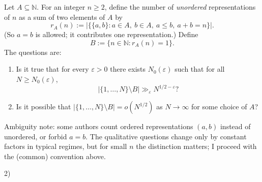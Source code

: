 Let $A\subseteq\mathbb{N}$. For an integer $n\ge 2$, define the number of \emph{unordered} representations of $n$ as a sum of two elements of $A$ by
\[
 r_A(n):=|\{\{a,b\}: a\in A,\ b\in A,\ a\le b,\ a+b=n\}|.
\]
(So $a=b$ is allowed; it contributes one representation.)
Define
\[
 B:=\{n\in\mathbb{N}: r_A(n)=1\}.
\]
The questions are:
\begin{enumerate}
\item[(Q1)] Is it true that for every $\varepsilon>0$ there exists $N_0(\varepsilon)$ such that for all $N\ge N_0(\varepsilon)$,
\[
|\{1,\dots,N\}\setminus B| \gg_{\varepsilon} N^{1/2-\varepsilon}?
\]
\item[(Q2)] Is it possible that $|\{1,\dots,N\}\setminus B|=o(N^{1/2})$ as $N\to\infty$ for some choice of $A$?
\end{enumerate}

Ambiguity note: some authors count ordered representations $(a,b)$ instead of unordered, or forbid $a=b$. The qualitative questions change only by constant factors in typical regimes, but for small $n$ the distinction matters; I proceed with the (common) convention above.

2)
